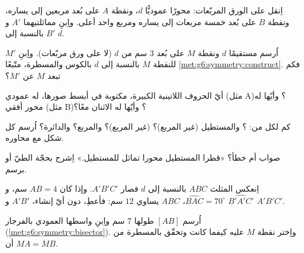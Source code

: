 \begin{exercise}[$\star$]\label{exo:g6:symmetry:1}
اِنقل على الورق المربّعات: محورًا عموديًّا $d$، ونقطة $A$ على بُعد مربعين إلى
يساره، ونقطة $B$ على بُعد خمسة مربعات إلى يساره ومربع واحد أعلى.
واِبنِ مماثلتيهما $A'$ و $B'$ بالنسبة إلى $d$.
\end{exercise}

\begin{exercise}[$\star$]\label{exo:g6:symmetry:2}
اُرسم مستقيمًا $d$ ونقطة $M$ على بُعد $3$ سم من $d$ (لا على ورق
مربّعات). واِبنِ  $M'$ للنقطة $M$ بالنسبة إلى $d$ بالكوس
والمسطرة، متّبعًا \cref{met:g6:symmetry:construct}. فكم تبعد
$M$ عن $M'$؟
\end{exercise}

\begin{exercise}[$\star$]\label{exo:g6:symmetry:3}
أيّ الحروف اللاتينية الكبيرة، مكتوبة في أبسط صورها،
له  عمودي (مثل A)؟ وأيّها له محور أفقي (مثل B)؟
وأيّها له الاثنان معًا؟
\end{exercise}

\begin{exercise}[$\star$]\label{exo:g6:symmetry:4}
كم  لكل من: ؟ والمستطيل
(غير المربع)؟  (غير المربع)؟ والمربع؟ والدائرة؟
اُرسم كل شكل مع محاوره.
\end{exercise}

\begin{exercise}[$\star$]\label{exo:g6:symmetry:5}
صواب أم خطأ؟ «قطرا المستطيل محورا تماثل
للمستطيل.» اِشرح بحجّة الطيّ أو برسم.
\end{exercise}

\begin{exercise}[$\star$]\label{exo:g6:symmetry:6}
اِنعكس المثلث $ABC$ بالنسبة إلى  $d$ فصار $A'B'C'$. وإذا كان
$AB = 4$ سم، و $\widehat{BAC} = 70^\circ$،  $ABC$ يساوي
$12$ سم: فأعطِ، دون أيّ إنشاء، $A'B'$
و $\widehat{B'A'C'}$  $A'B'C'$.
\end{exercise}

\begin{exercise}[$\star$]\label{exo:g6:symmetry:7}
اُرسم  $[AB]$ طولها $7$ سم واِبنِ واسطها
العمودي بالفرجار (\cref{met:g6:symmetry:bisector}). واِختر نقطة
$M$ عليه كيفما كانت وتحقّق بالمسطرة من أن $MA = MB$.
\end{exercise}

